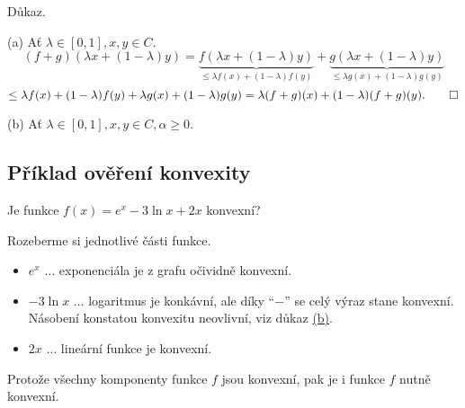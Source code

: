 Důkaz.

(a) Ať $\lambda \in [0,1], x, y \in C$.
\[
    (f+g)(\lambda x + (1-\lambda)y) = \underbrace{f(\lambda x + (1-\lambda)y)}_{\leq \lambda f(x) + (1-\lambda)f(y)} + 
    \underbrace{g(\lambda x + (1-\lambda)y)}_{\leq \lambda g(x) + (1-\lambda)g(y)}
\]
\[
    \leq \lambda f(x) + (1-\lambda)f(y) + \lambda g(x) + (1-\lambda)g(y) = \lambda (f+g)(x) + (1-\lambda)(f+g)(y). \qed
\]

(b) Ať $\lambda \in [0,1], x, y \in C, \alpha \geq 0$. %


\subsection{Příklad ověření konvexity}
Je funkce $f(x) = e^x - 3 \ln x + 2x$ konvexní?

Rozeberme si jednotlivé části funkce.
\begin{itemize}
    \item $e^x$ $\dots$ exponenciála je z grafu očividně konvexní.
    \item $-3 \ln x$ $\dots$ logaritmus je konkávní, ale díky \enquote{$\minus$} se celý výraz stane konvexní. Násobení konstatou 
    konvexitu neovlivní, viz důkaz \hyperref[ssKonv]{(b)}.
    \item $2x$ $\dots$ lineární funkce je konvexní.
\end{itemize}
Protože všechny komponenty funkce $f$ jsou konvexní, pak je i funkce $f$ nutně konvexní.